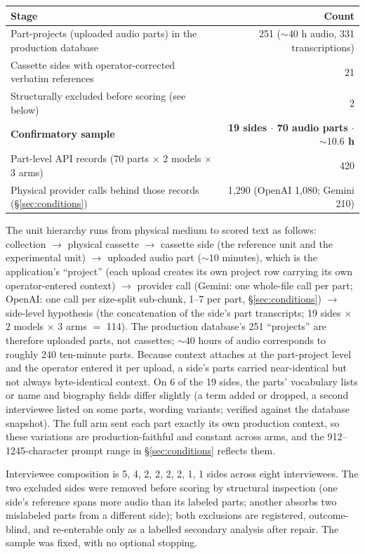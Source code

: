 \documentclass[11pt]{article}
\begin{document}
\begin{center}
\begin{tabular}{lr}
\toprule
Stage & Count \\
\midrule
Part-projects (uploaded audio parts) in the production database & 251 (${\sim}40$ h audio, 331 transcriptions) \\
Cassette sides with operator-corrected verbatim references & 21 \\
Structurally excluded before scoring (see below) & 2 \\
\textbf{Confirmatory sample} & \textbf{19 sides $\cdot$ 70 audio parts $\cdot$ ${\sim}10.6$ h} \\
Part-level API records (70 parts $\times$ 2 models $\times$ 3 arms) & 420 \\
Physical provider calls behind those records (\S\ref{sec:conditions}) & 1{,}290 (OpenAI 1{,}080; Gemini 210) \\
\bottomrule
\end{tabular}
\end{center}

The unit hierarchy runs from physical medium to scored text as follows: collection $\rightarrow$ physical cassette $\rightarrow$ cassette side (the reference unit and the experimental unit) $\rightarrow$ uploaded audio part (${\sim}10$ minutes), which is the application's ``project'' (each upload creates its own project row carrying its own operator-entered context) $\rightarrow$ provider call (Gemini: one whole-file call per part; OpenAI: one call per size-split sub-chunk, 1--7 per part, \S\ref{sec:conditions}) $\rightarrow$ side-level hypothesis (the concatenation of the side's part transcripts; 19 sides $\times$ 2 models $\times$ 3 arms $=$ 114). The production database's 251 ``projects'' are therefore uploaded parts, not cassettes; ${\sim}40$ hours of audio corresponds to roughly 240 ten-minute parts. Because context attaches at the part-project level and the operator entered it per upload, a side's parts carried near-identical but not always byte-identical context. On 6 of the 19 sides, the parts' vocabulary lists or name and biography fields differ slightly (a term added or dropped, a second interviewee listed on some parts, wording variants; verified against the database snapshot). The full arm sent each part exactly its own production context, so these variations are production-faithful and constant across arms, and the 912--1245-character prompt range in \S\ref{sec:conditions} reflects them.

Interviewee composition is 5, 4, 2, 2, 2, 2, 1, 1 sides across eight interviewees. The two excluded sides were removed before scoring by structural inspection (one side's reference spans more audio than its labeled parts; another absorbs two mislabeled parts from a different side); both exclusions are registered, outcome-blind, and re-enterable only as a labelled secondary analysis after repair. The sample was fixed, with no optional stopping.
\end{document}
